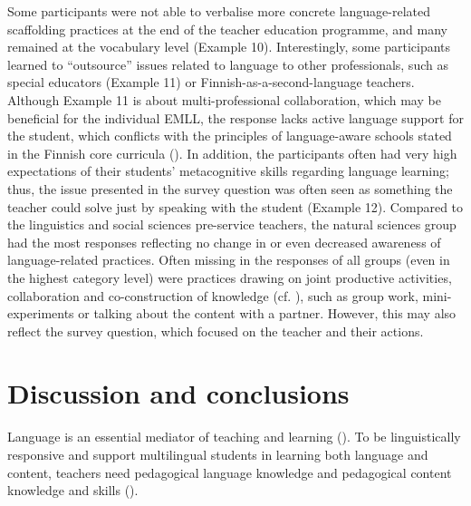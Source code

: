 \documentclass[output=paper]{langscibook}
\begin{document}
Some participants were not able to verbalise more concrete language-related scaffolding practices at the end of the teacher education programme, and many remained at the vocabulary level (Example 10). Interestingly, some participants learned to “outsource” issues related to language to other professionals, such as special educators (Example 11) or Finnish-as-a-second-language teachers. Although Example 11 is about multi-professional collaboration, which may be beneficial for the individual EMLL, the response lacks active language support for the student, which conflicts with the principles of language-aware schools stated in the Finnish core curricula (\citealt{EDUFI2014, Edufi2019}). In addition, the participants often had very high expectations of their students’ metacognitive skills regarding language learning; thus, the issue presented in the survey question was often seen as something the teacher could solve just by speaking with the student (Example 12). Compared to the linguistics and social sciences pre-service teachers, the natural sciences group had the most responses reflecting no change in or even decreased awareness of language-related practices. Often missing in the responses of all groups (even in the highest category level) were practices drawing on joint productive activities, collaboration and co-construction of knowledge (cf. \citealt{LucasVillegas2013}), such as group work, mini-experiments or talking about the content with a partner. However, this may also reflect the survey question, which focused on the teacher and their actions.

\section{Discussion and conclusions}\label{sec:heikkola:6}

Language is an essential mediator of teaching and learning (\citealt{Bunch2013}). To be linguistically responsive and support multilingual students in learning both language and content, teachers need pedagogical language knowledge and pedagogical content knowledge and skills (\citealt{Bunch2013,LucasVillegas2013}).
\end{document}

